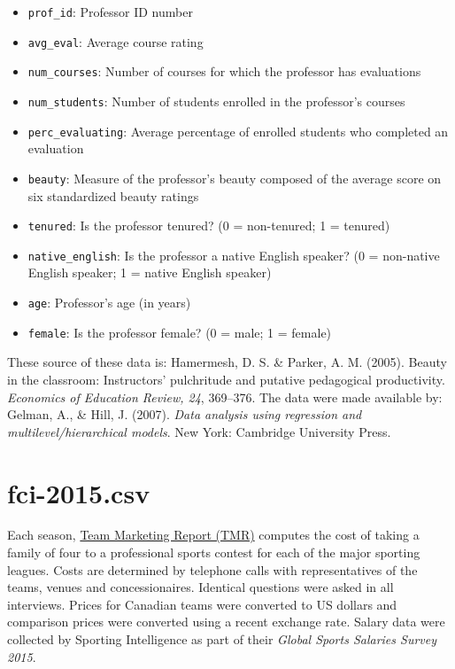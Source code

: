 \documentclass[]{book}
\providecommand{\tightlist}{%
  \setlength{\itemsep}{0pt}\setlength{\parskip}{0pt}}
\begin{document}
\begin{itemize}
\tightlist
\item
  \texttt{prof\_id}: Professor ID number
\item
  \texttt{avg\_eval}: Average course rating
\item
  \texttt{num\_courses}: Number of courses for which the professor has evaluations
\item
  \texttt{num\_students}: Number of students enrolled in the professor's courses
\item
  \texttt{perc\_evaluating}: Average percentage of enrolled students who completed an evaluation
\item
  \texttt{beauty}: Measure of the professor's beauty composed of the average score on six standardized beauty ratings
\item
  \texttt{tenured}: Is the professor tenured? (0 = non-tenured; 1 = tenured)
\item
  \texttt{native\_english}: Is the professor a native English speaker? (0 = non-native English speaker; 1 = native English speaker)
\item
  \texttt{age}: Professor's age (in years)
\item
  \texttt{female}: Is the professor female? (0 = male; 1 = female)
\end{itemize}

These source of these data is: Hamermesh, D. S. \& Parker, A. M. (2005). Beauty in the classroom: Instructors' pulchritude and putative pedagogical productivity. \emph{Economics of Education Review, 24}, 369--376. The data were made available by: Gelman, A., \& Hill, J. (2007). \emph{Data analysis using regression and multilevel/hierarchical models}. New York: Cambridge University Press.

\hypertarget{fci-2015}{%
\section*{fci-2015.csv}\label{fci-2015}}

Each season, \href{http://www.teammarketing.com/}{Team Marketing Report (TMR)} computes the cost of taking a family of four to a professional sports contest for each of the major sporting leagues. Costs are determined by telephone calls with representatives of the teams, venues and concessionaires. Identical questions were asked in all interviews. Prices for Canadian teams were converted to US dollars and comparison prices were converted using a recent exchange rate. Salary data were collected by Sporting Intelligence as part of their \emph{Global Sports Salaries Survey 2015}.
\end{document}
